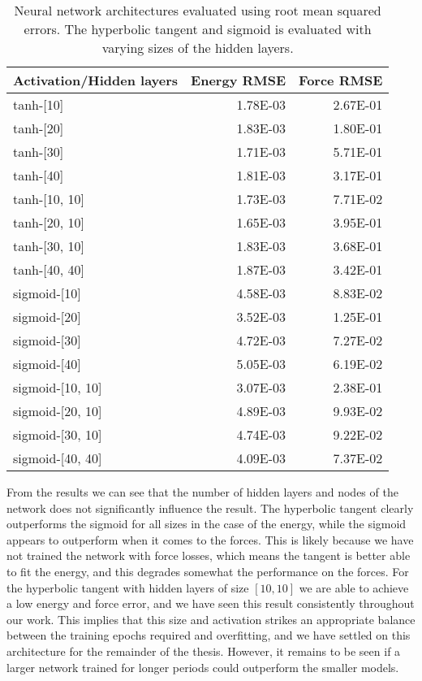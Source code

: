 \begin{table}[H]
\centering
\caption{Neural network architectures evaluated using root mean
    squared errors. The hyperbolic tangent and sigmoid is evaluated
    with varying sizes of the hidden layers.}
\label{table:act-hidden}
\begin{tabular}{lrr}
\toprule
Activation/Hidden layers &  Energy RMSE &  Force RMSE \\
\midrule
               tanh-[10] &     1.78E-03 &    2.67E-01 \\
               tanh-[20] &     1.83E-03 &    1.80E-01 \\
               tanh-[30] &     1.71E-03 &    5.71E-01 \\
               tanh-[40] &     1.81E-03 &    3.17E-01 \\
           tanh-[10, 10] &     1.73E-03 &    7.71E-02 \\
           tanh-[20, 10] &     1.65E-03 &    3.95E-01 \\
           tanh-[30, 10] &     1.83E-03 &    3.68E-01 \\
           tanh-[40, 40] &     1.87E-03 &    3.42E-01 \\
            sigmoid-[10] &     4.58E-03 &    8.83E-02 \\
            sigmoid-[20] &     3.52E-03 &    1.25E-01 \\
            sigmoid-[30] &     4.72E-03 &    7.27E-02 \\
            sigmoid-[40] &     5.05E-03 &    6.19E-02 \\
        sigmoid-[10, 10] &     3.07E-03 &    2.38E-01 \\
        sigmoid-[20, 10] &     4.89E-03 &    9.93E-02 \\
        sigmoid-[30, 10] &     4.74E-03 &    9.22E-02 \\
        sigmoid-[40, 40] &     4.09E-03 &    7.37E-02 \\
\bottomrule
\end{tabular}
\end{table}

From the results we can see that the number of hidden layers
and nodes of the network does not significantly influence the result.
The hyperbolic tangent clearly
outperforms the sigmoid for all sizes in the case of the energy,
while the sigmoid appears to outperform when it comes to the forces.
This is likely because we have not trained the network with force losses,
which means the tangent is better able to fit the energy, and this
degrades somewhat the performance on the forces.
For the hyperbolic tangent with hidden layers of size 
$\left[10, 10\right]$ we are able
to achieve a low energy and force error, and we have seen this result
consistently throughout our work.
This implies that this size and activation strikes an appropriate balance
between the training epochs required and overfitting, and we have settled
on this architecture for the remainder of the thesis.
However, it remains to be seen if a larger network trained for longer
periods could outperform the smaller models.


